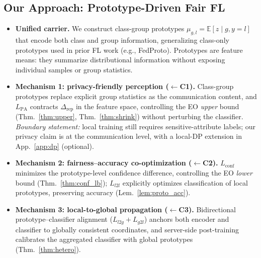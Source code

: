 \documentclass{article}
\newcommand{\E}{\mathbb{E}}
\newcommand{\rep}{\Delta_{\mathrm{rep}}}
\newcommand{\proto}{\mu}
\begin{document}
\subsection{Our Approach: Prototype-Driven Fair FL}
\begin{itemize}
  \item \textbf{Unified carrier.} We construct class-group prototypes
        $\proto_{g,l} = \E[z \mid g, y=l]$ that encode both class and group
        information, generalizing class-only prototypes used in prior FL
        work (e.g., FedProto). Prototypes are feature means: they summarize
        distributional information without exposing individual samples or
        group statistics.
  \item \textbf{Mechanism 1: privacy-friendly perception ($\leftarrow$C1).}
        Class-group prototypes replace explicit group statistics as the
        communication content, and $L_{\mathrm{PA}}$ contracts $\rep$ in the
        feature space, controlling the EO \emph{upper} bound
        (Thm.~\ref{thm:upper}, Thm.~\ref{thm:shrink}) without perturbing the
        classifier. \emph{Boundary statement:} local training still requires
        sensitive-attribute labels; our privacy claim is at the
        communication level, with a local-DP extension in
        App.~\ref{app:dp} (optional).
  \item \textbf{Mechanism 2: fairness--accuracy co-optimization
        ($\leftarrow$C2).} $L_{\mathrm{conf}}$ minimizes the prototype-level
        confidence difference, controlling the EO \emph{lower} bound
        (Thm.~\ref{thm:conf_lb}); $L_{l2l}$ explicitly optimizes
        classification of local prototypes, preserving accuracy
        (Lem.~\ref{lem:proto_acc}).
  \item \textbf{Mechanism 3: local-to-global propagation ($\leftarrow$C3).}
        Bidirectional prototype--classifier alignment ($L_{l2g}+L_{g2l}$)
        anchors both encoder and classifier to globally consistent
        coordinates, and server-side post-training calibrates the aggregated
        classifier with global prototypes (Thm.~\ref{thm:hetero}).
\end{itemize}
\end{document}
